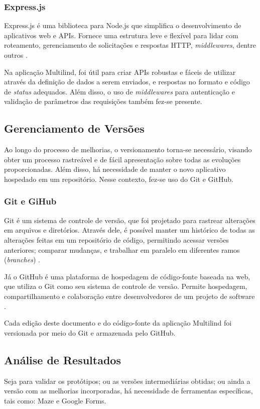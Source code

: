 \subsubsection{Express.js}
\label{sec:Express.js}
Express.js é uma biblioteca para Node.js que simplifica o desenvolvimento de aplicativos web e APIs. Fornece uma estrutura leve e flexível para 
lidar com roteamento, gerenciamento de solicitações e respostas HTTP, \textit{middlewares}, dentre outros \cite{expressjs}.

Na aplicação Multilind, foi útil para criar APIs robustas e fáceis de utilizar através da definição de dados a serem enviados, e respostas 
no formato e código de \textit{status} adequados. Além disso, o uso de \textit{middlewares} para autenticação e validação de parâmetros das requisições também fez-se presente.

\subsection{Gerenciamento de Versões}
\label{sec:Gerenciamento de Versoes}
Ao longo do processo de melhorias, o versionamento torna-se necessário, visando obter um processo rastreável e de fácil apresentação sobre todas as evoluções 
proporcionadas. Além disso, há necessidade de manter o novo aplicativo hospedado em um repositório. Nesse contexto, fez-se uso do Git e GitHub.

\subsubsection{Git e GiHub}
\label{sec:Git e GiHub}
Git é um sistema de controle de versão, que foi projetado para rastrear alterações em arquivos e diretórios. Através dele, é 
possível manter um histórico de todas as alterações feitas em um repositório de código, permitindo acessar versões anteriores; 
comparar mudanças, e trabalhar em paralelo em diferentes ramos (\textit{branches}) \cite{git}.

Já o GitHub é uma plataforma de hospedagem de código-fonte baseada na web, que utiliza o Git como seu sistema de controle de 
versão. Permite hospedagem, compartilhamento e colaboração entre desenvolvedores de um projeto de software \cite{github}.

Cada edição deste documento e do código-fonte da aplicação Multilind foi versionada por meio do Git e armazenada pelo GitHub. 

\subsection{Análise de Resultados}
\label{sec:Análise de Resultados}
Seja para validar os protótipos; ou as versões intermediárias obtidas; ou ainda a versão com as melhorias incorporadas, há necessidade de ferramentas específicas, 
tais como: Maze e Google Forms.

